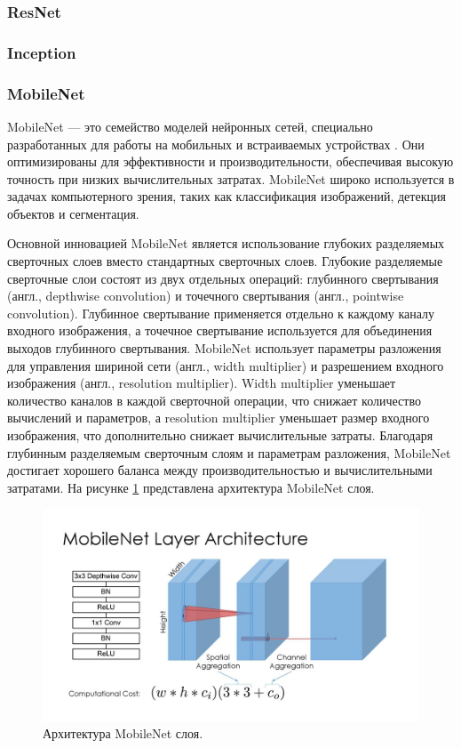 \documentclass[a4paper,12pt]{extarticle}
\begin{document}
\subsubsection{ResNet}

\subsubsection{Inception}
\subsubsection{MobileNet}

MobileNet — это семейство моделей нейронных сетей, специально разработанных для работы на мобильных и встраиваемых устройствах \cite{mobilenet}. Они оптимизированы для эффективности и производительности, обеспечивая высокую точность при низких вычислительных затратах. MobileNet широко используется в задачах компьютерного зрения, таких как классификация изображений, детекция объектов и сегментация.

Основной инновацией MobileNet является использование глубоких разделяемых сверточных слоев вместо стандартных сверточных слоев. Глубокие разделяемые сверточные слои состоят из двух отдельных операций: глубинного свертывания (англ., depthwise convolution) и точечного свертывания (англ., pointwise convolution). Глубинное свертывание применяется отдельно к каждому каналу входного изображения, а точечное свертывание используется для объединения выходов глубинного свертывания. MobileNet использует параметры разложения для управления шириной сети (англ., width multiplier) и разрешением входного изображения (англ., resolution multiplier).  Width multiplier уменьшает количество каналов в каждой сверточной операции, что снижает количество вычислений и параметров, а resolution multiplier уменьшает размер входного изображения, что дополнительно снижает вычислительные затраты. Благодаря глубинным разделяемым сверточным слоям и параметрам разложения, MobileNet достигает хорошего баланса между производительностью и вычислительными затратами. На рисунке \ref{fig:mobilenet} представлена архитектура MobileNet слоя.


\begin{figure}[ht]
	\centering
	\includegraphics[scale=0.8]{mobilenet.png}
	\caption{Архитектура MobileNet слоя.}
	\label{fig:mobilenet}
\end{figure}
\end{document}

